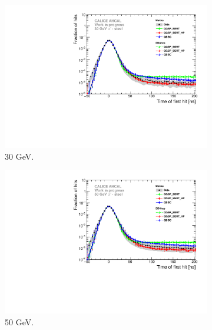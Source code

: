\begin{figure}[htbp!]
  \begin{subfigure}[t]{0.5\textwidth}
    \centering
    \includegraphics[width=1\textwidth]{../Thesis_Plots/Timing/Pions/Plots/Comparison_SimData_Pion30GeV_LateClusters.pdf}
    \caption{30 GeV.}\label{fig:dNdt_SimData_30GeV}
  \end{subfigure}
  \begin{subfigure}[t]{0.5\textwidth}
    \centering
    \includegraphics[width=1\textwidth]{../Thesis_Plots/Timing/Pions/Plots/Comparison_SimData_Pion50GeV_LateClusters.pdf}
    \caption{50 GeV.} \label{fig:dNdt_SimData_50GeV}
  \end{subfigure}
  \hfill
  \begin{subfigure}[t]{0.5\textwidth}
    \centering

\end{subfigure}
\end{figure}
